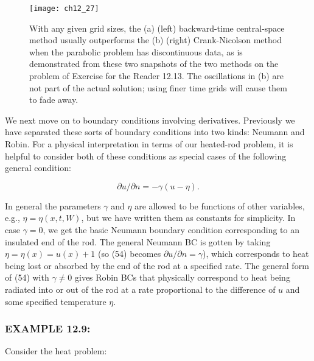 \documentclass[../main.tex]{subfiles}
\begin{document}
\begin{figure}[H]
	\centering
	\texttt{[image: ch12\_27]}
	\caption{\textsf{With any given grid sizes, the (a) (left) backward-time central-space method usually outperforms the (b) (right) Crank-Nicolson method when the parabolic problem has discontinuous data, as is demonstrated from these two snapshots of the two methods on the problem of Exercise for the Reader 12.13. The oscillations in (b) are not part of the actual solution; using finer time grids will cause them to fade away.}}
	\label{pfig:ch12_27}
\end{figure}
We next move on to boundary conditions involving derivatives. Previously we have separated these sorts of boundary conditions into two kinds: Neumann and Robin. For a physical interpretation in terms of our heated-rod problem, it is helpful to consider both of these conditions as special cases of the following general condition: 

\begin{equation}\label{eqa54}
\partial u/\partial n= -\gamma(u-\eta).
\end{equation}

In general the parameters $\gamma$ and $\eta$ are allowed to be functions of other variables, e.g., $\eta = \eta(x,t,W)$, but we have written them as constants for simplicity. In case $\gamma = 0$, we get the basic Neumann boundary condition corresponding to an insulated end of the rod. The general Neumann BC is gotten by taking  $\eta= \eta(x) = u(x) +1$ (so (54) becomes $\partial u/\partial n= \gamma$), which corresponds to heat being lost or absorbed by the end of the rod at a specified rate. The general form of (54) with $\gamma \neq 0$ gives Robin BCs that physically correspond to heat being radiated into or out of the rod at a rate proportional to the difference of $u$ and some specified temperature $\eta$.

\subsubsection{EXAMPLE 12.9:}
Consider the heat problem:
\end{document}
